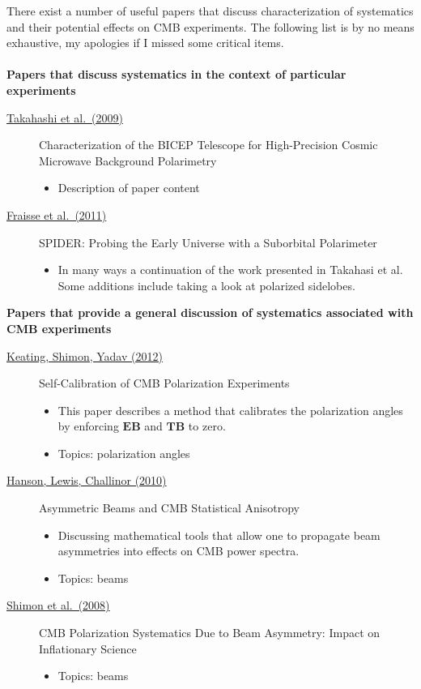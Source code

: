There exist a number of useful papers that discuss characterization of systematics and their potential effects on CMB experiments. The following list is by no means exhaustive, my apologies if I missed some critical items.
\\ \\
\textbf{Papers that discuss systematics in the context of particular experiments}
\begin{description}

\item[\href{https://arxiv.org/abs/0906.4069}{Takahashi et al.\ (2009)}] Characterization of the BICEP Telescope for High-Precision Cosmic Microwave Background Polarimetry
\begin{itemize}[noitemsep]
\item Description of paper content
\end{itemize}

\item[\href{https://arxiv.org/abs/1106.3087}{Fraisse et al.\ (2011)}] SPIDER: Probing the Early Universe with a Suborbital Polarimeter
\begin{itemize}[noitemsep]
\item In many ways a continuation of the work presented in Takahasi et al. Some additions include taking a look at polarized sidelobes.
\end{itemize}


\end{description}

\noindent \textbf{Papers that provide a general discussion of systematics associated with CMB experiments}
\begin{description}

\item[\href{https://arxiv.org/abs/1211.5734}{Keating, Shimon, Yadav (2012)}] Self-Calibration of CMB Polarization Experiments
\begin{itemize}[noitemsep]
\item This paper describes a method that calibrates the polarization angles by enforcing $\mathbf{EB}$ and $\mathbf{TB}$ to zero.
\item Topics: polarization angles
\end{itemize}

\item[\href{https://arxiv.org/abs/1003.0198}{Hanson, Lewis, Challinor (2010)}] Asymmetric Beams and CMB Statistical Anisotropy
\begin{itemize}[noitemsep]
\item Discussing mathematical tools that allow one to propagate beam asymmetries into effects on CMB power spectra.
\item Topics: beams
\end{itemize}

\item[\href{https://arxiv.org/abs/0709.1513v4}{Shimon et al.\ (2008)}] CMB Polarization Systematics Due to Beam Asymmetry: Impact on Inflationary Science
\begin{itemize}[noitemsep]
\item Topics: beams
\end{itemize}

\end{description}
